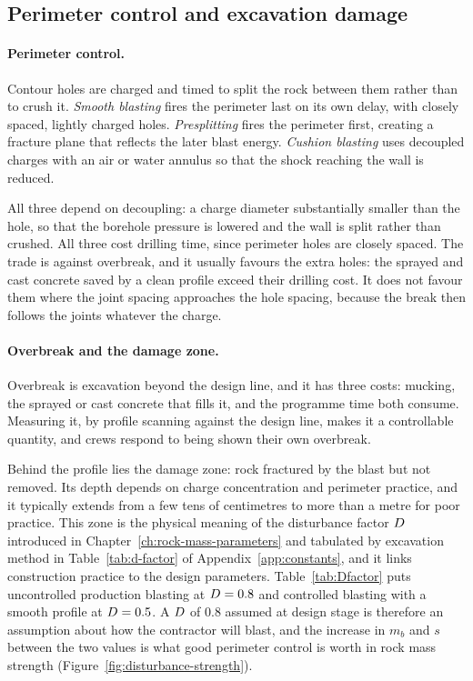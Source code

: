 \subsection{Perimeter control and excavation damage}
\label{sec:perimeter-damage}

\paragraph{Perimeter control.}
Contour holes are charged and timed to split the rock between them rather than
to crush it. \emph{Smooth blasting} fires the perimeter last on its own delay,
with closely spaced, lightly charged holes. \emph{Presplitting} fires the
perimeter first, creating a fracture plane that reflects the later blast
energy. \emph{Cushion blasting} uses decoupled charges with an air or water
annulus so that the shock reaching the wall is reduced.

All three depend on decoupling: a charge diameter substantially smaller than
the hole, so that the borehole pressure is lowered and the wall is split
rather than crushed. All three cost drilling time, since perimeter holes are
closely spaced. The trade is against overbreak, and it usually favours the
extra holes: the sprayed and cast concrete saved by a clean profile exceed
their drilling cost. It does not favour them where the joint spacing
approaches the hole spacing, because the break then follows the joints
whatever the charge.

\paragraph{Overbreak and the damage zone.}
Overbreak is excavation beyond the design line, and it has three costs:
mucking, the sprayed or cast concrete that fills it, and the
programme time both consume. Measuring it, by profile scanning against the design
line, makes it a controllable quantity, and
crews respond to being shown their own overbreak.

Behind the profile lies the damage zone: rock fractured by the blast but
not removed. Its depth depends on charge concentration and perimeter practice,
and it typically extends from a few tens of centimetres to more than a metre
for poor practice. This zone is the physical meaning of the disturbance factor
$D$ introduced in Chapter~\ref{ch:rock-mass-parameters} and tabulated by
excavation method in Table~\ref{tab:d-factor} of Appendix~\ref{app:constants},
and it links
construction practice to the design parameters.
Table~\ref{tab:Dfactor} puts uncontrolled production blasting at
$D = 0.8$ and controlled blasting with a smooth profile at $D = 0.5$.
A $D$ of 0.8 assumed at design stage is therefore an assumption about
how the contractor will blast, and the increase in $m_b$ and $s$ between the
two values is what good perimeter control is worth in rock mass strength
(Figure~\ref{fig:disturbance-strength}).

